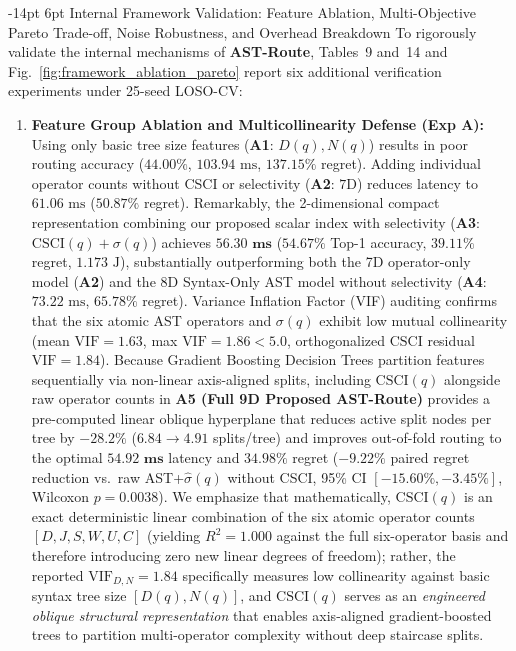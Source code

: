 \documentclass[10pt,a4paper]{article}
\makeatletter
\renewcommand\subsection{\@startsection{subsection}{2}{\z@}%
  {-14pt \@plus -3pt \@minus -1.5pt}%
  {6pt \@plus 1.5pt}%
  {\normalfont\normalsize\bfseries}}
\makeatother
\begin{document}
\subsection{Internal Framework Validation: Feature Ablation, Multi-Objective Pareto Trade-off, Noise Robustness, and Overhead Breakdown}
To rigorously validate the internal mechanisms of \textbf{AST-Route}, Tables~9 and~14 and Fig.~\ref{fig:framework_ablation_pareto} report six additional verification experiments under 25-seed LOSO-CV:
\begin{enumerate}[leftmargin=1.5em,itemsep=2pt]
    \item \textbf{Feature Group Ablation and Multicollinearity Defense (Exp A):} Using only basic tree size features (\textbf{A1}: $D(q), N(q)$) results in poor routing accuracy ($44.00\%$, $103.94\text{ ms}$, $137.15\%$ regret). Adding individual operator counts without CSCI or selectivity (\textbf{A2}: $7\text{D}$) reduces latency to $61.06\text{ ms}$ ($50.87\%$ regret). Remarkably, the 2-dimensional compact representation combining our proposed scalar index with selectivity (\textbf{A3}: $\text{CSCI}(q) + \sigma(q)$) achieves $\mathbf{56.30\text{ ms}}$ ($54.67\%$ Top-1 accuracy, $39.11\%$ regret, $1.173\text{ J}$), substantially outperforming both the 7D operator-only model (\textbf{A2}) and the 8D Syntax-Only AST model without selectivity (\textbf{A4}: $73.22\text{ ms}$, $65.78\%$ regret). Variance Inflation Factor (VIF) auditing confirms that the six atomic AST operators and $\sigma(q)$ exhibit low mutual collinearity (mean $\text{VIF} = 1.63$, max $\text{VIF} = 1.86 < 5.0$, orthogonalized $\text{CSCI}$ residual $\text{VIF} = 1.84$). Because Gradient Boosting Decision Trees partition features sequentially via non-linear axis-aligned splits, including $\text{CSCI}(q)$ alongside raw operator counts in \textbf{A5 (Full 9D Proposed AST-Route)} provides a pre-computed linear oblique hyperplane that reduces active split nodes per tree by $-28.2\%$ ($6.84 \rightarrow 4.91$ splits/tree) and improves out-of-fold routing to the optimal $\mathbf{54.92\text{ ms}}$ latency and $\mathbf{34.98\%}$ regret ($-9.22\%$ paired regret reduction vs.\ raw AST+$\hat{\sigma}(q)$ without CSCI, 95\% CI $[-15.60\%, -3.45\%]$, Wilcoxon $p=0.0038$). We emphasize that mathematically, $\text{CSCI}(q)$ is an exact deterministic linear combination of the six atomic operator counts $[D,J,S,W,U,C]$ (yielding $R^2=1.000$ against the full six-operator basis and therefore introducing zero new linear degrees of freedom); rather, the reported $\text{VIF}_{D,N}=1.84$ specifically measures low collinearity against basic syntax tree size $[D(q), N(q)]$, and $\text{CSCI}(q)$ serves as an \emph{engineered oblique structural representation} that enables axis-aligned gradient-boosted trees to partition multi-operator complexity without deep staircase splits.

\end{enumerate}
\end{document}
